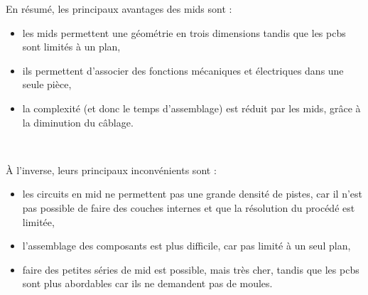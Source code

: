 En résumé, les principaux avantages des \glspl{mid} sont :
\begin{itemize}
    \item les \glspl{mid} permettent une géométrie en trois dimensions tandis que les \glspl{pcb} sont limités à un plan,
    \item ils permettent d'associer des fonctions mécaniques et électriques dans une seule pièce,
    \item la complexité (et donc le temps d'assemblage) est réduit par les \glspl{mid}, grâce à la diminution du câblage.
\end{itemize}

~

À l'inverse, leurs principaux inconvénients sont :
\begin{itemize}
    \item les circuits en \gls{mid} ne permettent pas une grande densité de pistes, car il n'est pas possible de faire des couches internes et que la résolution du procédé est limitée,
    \item l'assemblage des composants est plus difficile, car pas limité à un seul plan,
    \item faire des petites séries de \gls{mid} est possible, mais très cher, tandis que les \glspl{pcb} sont plus abordables car ils ne demandent pas de moules.
\end{itemize}
